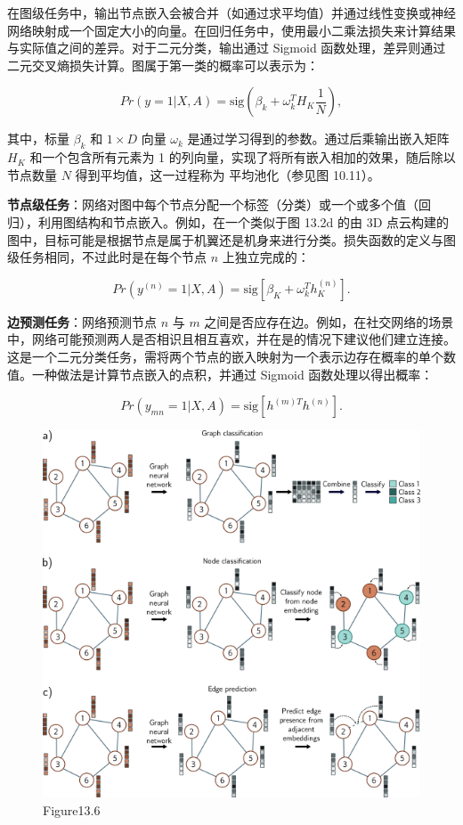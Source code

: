 在图级任务中，输出节点嵌入会被合并（如通过求平均值）并通过线性变换或神经网络映射成一个固定大小的向量。在回归任务中，使用最小二乘法损失来计算结果与实际值之间的差异。对于二元分类，输出通过 Sigmoid 函数处理，差异则通过二元交叉熵损失计算。图属于第一类的概率可以表示为：

\begin{equation}
Pr(y = 1|X, A) = \text{sig}(\beta_k + \omega_k^T H_K \frac{1}{N}), 
\end{equation}

其中，标量 \(\beta_k\) 和 \(1 \times D\) 向量 \(\omega_k\) 是通过学习得到的参数。通过后乘输出嵌入矩阵 \(H_K\) 和一个包含所有元素为 1 的列向量，实现了将所有嵌入相加的效果，随后除以节点数量 \(N\) 得到平均值，这一过程称为 平均池化（参见图 10.11）。

\textbf{节点级任务}：网络对图中每个节点分配一个标签（分类）或一个或多个值（回归），利用图结构和节点嵌入。例如，在一个类似于图 13.2d 的由 3D 点云构建的图中，目标可能是根据节点是属于机翼还是机身来进行分类。损失函数的定义与图级任务相同，不过此时是在每个节点 \(n\) 上独立完成的：

\begin{equation}
Pr(y^{(n)} = 1|X, A) = \text{sig}\left[\beta_K + \omega_k^T h_K^{(n)} \right]. 
\end{equation}

\textbf{边预测任务}：网络预测节点 \(n\) 与 \(m\) 之间是否应存在边。例如，在社交网络的场景中，网络可能预测两人是否相识且相互喜欢，并在是的情况下建议他们建立连接。这是一个二元分类任务，需将两个节点的嵌入映射为一个表示边存在概率的单个数值。一种做法是计算节点嵌入的点积，并通过 Sigmoid 函数处理以得出概率：

\begin{equation}
Pr(y_{mn} = 1|X, A) = \text{sig}\left[h^{(m)T}h^{(n)} \right]. 
\end{equation}
\begin{figure}[ht!]
\centering
\includegraphics[width=0.7\linewidth]{png/chapter13/GraphProblems.png}
\caption{Figure13.6}
\end{figure}

